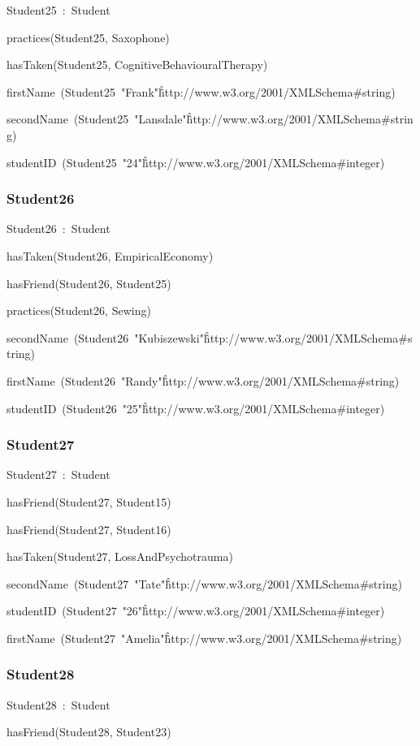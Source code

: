\documentclass{article}
\begin{document}
Student25~:~Student

practices(Student25, Saxophone)

hasTaken(Student25, CognitiveBehaviouralTherapy)

firstName~(Student25~"Frank"\^\^http://www.w3.org/2001/XMLSchema#string)

secondName~(Student25~"Lansdale"\^\^http://www.w3.org/2001/XMLSchema#string)

studentID~(Student25~"24"\^\^http://www.w3.org/2001/XMLSchema#integer)

\subsubsection*{Student26}

Student26~:~Student

hasTaken(Student26, EmpiricalEconomy)

hasFriend(Student26, Student25)

practices(Student26, Sewing)

secondName~(Student26~"Kubiszewski"\^\^http://www.w3.org/2001/XMLSchema#string)

firstName~(Student26~"Randy"\^\^http://www.w3.org/2001/XMLSchema#string)

studentID~(Student26~"25"\^\^http://www.w3.org/2001/XMLSchema#integer)

\subsubsection*{Student27}

Student27~:~Student

hasFriend(Student27, Student15)

hasFriend(Student27, Student16)

hasTaken(Student27, LossAndPsychotrauma)

secondName~(Student27~"Tate"\^\^http://www.w3.org/2001/XMLSchema#string)

studentID~(Student27~"26"\^\^http://www.w3.org/2001/XMLSchema#integer)

firstName~(Student27~"Amelia"\^\^http://www.w3.org/2001/XMLSchema#string)

\subsubsection*{Student28}

Student28~:~Student

hasFriend(Student28, Student23)
\end{document}
